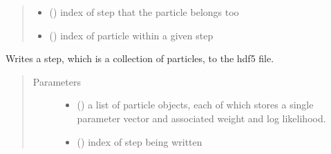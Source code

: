 \documentclass[letterpaper,10pt,english]{sphinxmanual}
\begin{document}
\begin{fulllineitems}
\begin{fulllineitems}
\begin{quote}
\begin{description}
\begin{itemize}
\item {} 
 () \textendash{} index of step that the particle belongs too

\item {} 
 () \textendash{} index of particle within a given step

\end{itemize}

\end{description}\end{quote}

\end{fulllineitems}


\begin{fulllineitems}
\label{\detokenize{source_code:smcpy.hdf5.hdf5_storage.HDF5Storage.write_step}}
Writes a step, which is a collection of particles, to the hdf5 file.
\begin{quote}\begin{description}
\item[{Parameters}] \leavevmode\begin{itemize}
\item {} 
 () \textendash{} a list of particle objects, each of which stores a single
parameter vector and associated weight and log likelihood.

\item {} 
 () \textendash{} index of step being written

\end{itemize}

\end{description}\end{quote}

\end{fulllineitems}



\end{fulllineitems}
\end{document}

